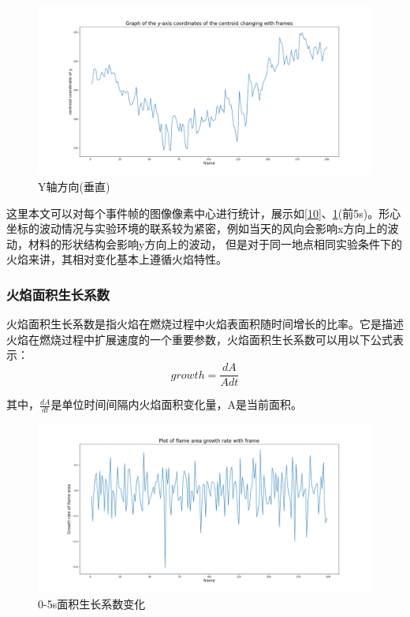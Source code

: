 \begin{figure}[ht]
    \centering
    \includegraphics[width=\textwidth]{figures/extract_centroid_y.png}
    \caption{Y轴方向(垂直)}
    \label{11}
\end{figure}

这里本文可以对每个事件帧的图像像素中心进行统计，展示如\ref{10}、\ref{11}(前5s)。形心坐标的波动情况与实验环境的联系较为紧密，例如当天的风向会影响x方向上的波动，材料的形状结构会影响y方向上的波动，
但是对于同一地点相同实验条件下的火焰来讲，其相对变化基本上遵循火焰特性。

\subsubsection{火焰面积生长系数}
火焰面积生长系数是指火焰在燃烧过程中火焰表面积随时间增长的比率。它是描述火焰在燃烧过程中扩展速度的一个重要参数，火焰面积生长系数可以用以下公式表示：
\begin{equation} 
    growth=\frac{dA}{Adt}
\end{equation}

其中，$\frac{dA}{dt}$是单位时间间隔内火焰面积变化量，A是当前面积。

\begin{figure}[ht]
    \centering
    \includegraphics[width=\textwidth]{figures/extract_area_01.png}
    \caption{0-5s面积生长系数变化}
    \label{12}
\end{figure}


